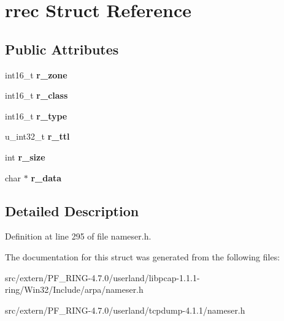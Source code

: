 \hypertarget{structrrec}{
\section{rrec Struct Reference}
\label{structrrec}
}
\subsection*{Public Attributes}
\begin{DoxyCompactItemize}
\item 
\hypertarget{structrrec_a9be632ca8e3190eac2c4efad33e4b32b}{
int16\_\-t {\bfseries r\_\-zone}}
\label{structrrec_a9be632ca8e3190eac2c4efad33e4b32b}

\item 
\hypertarget{structrrec_a51c424303c9cedbea0e752f81be0754e}{
int16\_\-t {\bfseries r\_\-class}}
\label{structrrec_a51c424303c9cedbea0e752f81be0754e}

\item 
\hypertarget{structrrec_ae71ce0574cf3f112be1457a0436d87d2}{
int16\_\-t {\bfseries r\_\-type}}
\label{structrrec_ae71ce0574cf3f112be1457a0436d87d2}

\item 
\hypertarget{structrrec_ab0c9c1bce1ed6b21ec772044fb8f56a0}{
u\_\-int32\_\-t {\bfseries r\_\-ttl}}
\label{structrrec_ab0c9c1bce1ed6b21ec772044fb8f56a0}

\item 
\hypertarget{structrrec_aa6caa2c1d664266a5d3d346093d51c0b}{
int {\bfseries r\_\-size}}
\label{structrrec_aa6caa2c1d664266a5d3d346093d51c0b}

\item 
\hypertarget{structrrec_a27559dcdf74a4d030a9997ab693726a6}{
char $\ast$ {\bfseries r\_\-data}}
\label{structrrec_a27559dcdf74a4d030a9997ab693726a6}

\end{DoxyCompactItemize}


\subsection{Detailed Description}


Definition at line 295 of file nameser.h.



The documentation for this struct was generated from the following files:\begin{DoxyCompactItemize}
\item 
src/extern/PF\_\-RING-\/4.7.0/userland/libpcap-\/1.1.1-\/ring/Win32/Include/arpa/nameser.h\item 
src/extern/PF\_\-RING-\/4.7.0/userland/tcpdump-\/4.1.1/nameser.h\end{DoxyCompactItemize}
